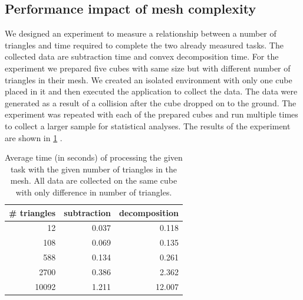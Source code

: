 \subsection{Performance impact of mesh complexity}
We designed an experiment to measure a relationship between a number of triangles and time required to complete the two already measured tasks. The collected data are subtraction time and convex decomposition time. For the experiment we prepared five cubes with same size but with different number of triangles in their mesh. We created an isolated environment with only one cube placed in it and then executed the application to collect the data. The data were generated as a result of a collision after the cube dropped on to the ground. The experiment was repeated with each of the prepared cubes and run multiple times to collect a larger sample for statistical analyses. The results of the experiment are shown in \cref{tab:subtraction-decomposition} . 
\begin{table}
\centering
\begin{tabular}{r r r}
\# triangles & subtraction & decomposition \\
\hline
12 & 0.037 & 0.118 \\
108 & 0.069 & 0.135 \\
588 & 0.134 & 0.261 \\ 
2700 & 0.386 & 2.362 \\ 
10092 & 1.211 & 12.007 \\
\end{tabular}
\caption{Average time (in seconds) of processing the given task with the given number of triangles in the mesh. All data are collected on the same cube with only difference in number of triangles.}
\label{tab:subtraction-decomposition}
\end{table}

